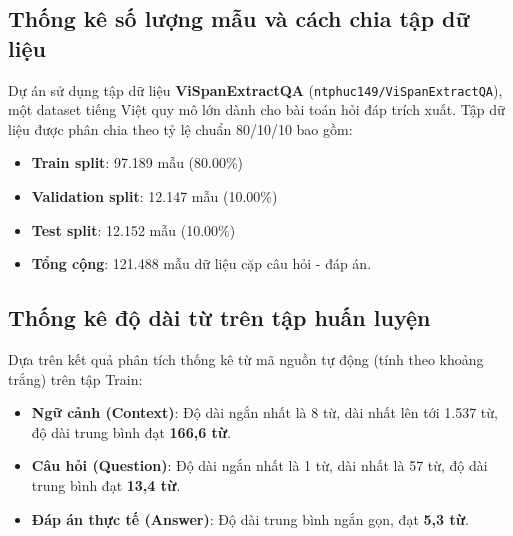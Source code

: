 \documentclass[12pt, a4paper]{article}
\begin{document}
\subsection{Thống kê số lượng mẫu và cách chia tập dữ liệu}
Dự án sử dụng tập dữ liệu \textbf{ViSpanExtractQA} (\texttt{ntphuc149/ViSpanExtractQA}), một dataset tiếng Việt quy mô lớn dành cho bài toán hỏi đáp trích xuất. Tập dữ liệu được phân chia theo tỷ lệ chuẩn 80/10/10 bao gồm:
\begin{itemize}
    \item \textbf{Train split}: 97.189 mẫu (80.00\%)
    \item \textbf{Validation split}: 12.147 mẫu (10.00\%)
    \item \textbf{Test split}: 12.152 mẫu (10.00\%)
    \item \textbf{Tổng cộng}: 121.488 mẫu dữ liệu cặp câu hỏi - đáp án.
\end{itemize}

\subsection{Thống kê độ dài từ trên tập huấn luyện}
Dựa trên kết quả phân tích thống kê từ mã nguồn tự động (tính theo khoảng trắng) trên tập Train:
\begin{itemize}
    \item \textbf{Ngữ cảnh (Context)}: Độ dài ngắn nhất là 8 từ, dài nhất lên tới 1.537 từ, độ dài trung bình đạt \textbf{166,6 từ}.
    \item \textbf{Câu hỏi (Question)}: Độ dài ngắn nhất là 1 từ, dài nhất là 57 từ, độ dài trung bình đạt \textbf{13,4 từ}.
    \item \textbf{Đáp án thực tế (Answer)}: Độ dài trung bình ngắn gọn, đạt \textbf{5,3 từ}.
\end{itemize}
\end{document}
